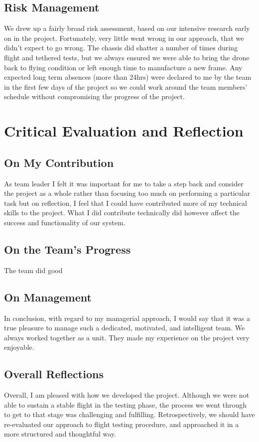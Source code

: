 \documentclass[a4paper,11pt]{article}
\begin{document}
\subsection{Risk Management}
We drew up a fairly broad risk assessment, based on our intensive research early on in the project. Fortunately, very little went wrong in our approach, that we didn't expect to go wrong. The chassis did shatter a number of times during flight and tethered tests, but we always ensured we were able to bring the drone back to flying condition or left enough time to manufacture a new frame. Any expected long term absences (more than 24hrs) were declared to me by the team in the first few days of the project so we could work around the team members' schedule without compromising the progress of the project.


\section{Critical Evaluation and Reflection}
\subsection{On My Contribution}
 As team leader I felt it was important for me to take a step back and consider the project as a whole rather than focusing too much on performing a particular task but on reflection, I feel that I could have contributed more of my technical skills to the project. What I did contribute technically did however affect the success and functionality of our system.  
\subsection{On the Team's Progress}
The team did good
\subsection{On Management}
In conclusion, with regard to my managerial approach, I would say that it was a true pleasure to manage such a dedicated, motivated, and intelligent team. We always worked together as a unit. They made my experience on the project very enjoyable.
\subsection{Overall Reflections}
Overall, I am pleased with how we developed the project. Although we were not able to sustain a stable flight in the testing phase, the process we went through to get to that stage was challenging and fulfilling. 
Retrospectively, we should have re-evaluated our approach to flight testing procedure, and approached it in a more structured and thoughtful way.
\end{document}
